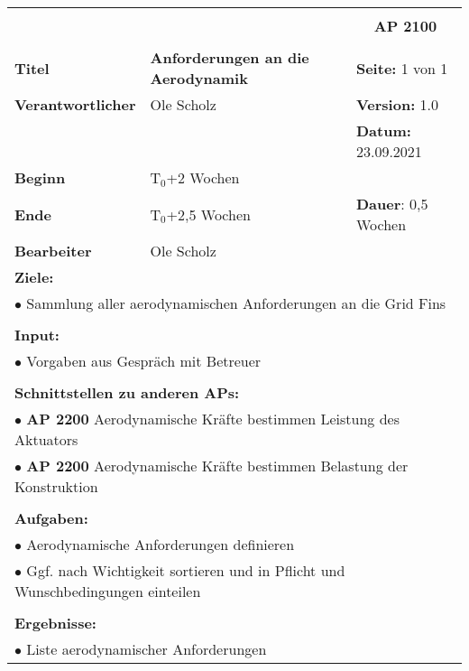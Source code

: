 \clearpage
\begin{table}[!h]
	\begin{center}
		\begin{tabular}{|p{35mm}||p{55mm}|p{50mm}||p{40mm}|}
			\hline
			\multicolumn{3}{|l||}{\textbf{}} & \multicolumn{1}{c|}{}\\
			\multicolumn{3}{|l||}{\textbf{}} & \multicolumn{1}{c|}{\textbf{AP 2100}}\\
			\multicolumn{3}{|l||}{\textbf{}} & \multicolumn{1}{c|}{}\\
			\hline\hline
			\textbf{Titel} & \multicolumn{2}{p{7cm}||}{\textbf{Anforderungen an die Aerodynamik}} 
			& \textbf{Seite:} 1 von 1\\
			\hline
			\textbf{Verantwortlicher} & \multicolumn{2}{l||}{Ole Scholz} & \textbf{Version:} 1.0\\
			\hline
			\multicolumn{3}{|l||}{} & \textbf{Datum:} 23.09.2021\\
			\hline\hline
			\textbf{Beginn} & \multicolumn{2}{l||}{T$_0$+2 Wochen} & \\
			\hline
			\textbf{Ende} & \multicolumn{2}{l||}{T$_0$+2,5 Wochen} & \textbf{Dauer}: 0,5 Wochen\\
			\hline\hline
			\textbf{Bearbeiter} & \multicolumn{3}{l|}{Ole Scholz}\\
			\hline\hline
			\multicolumn{4}{|p{150mm}|}{\textbf{Ziele:}}\\
			\multicolumn{4}{|p{150mm}|}{$\bullet$ Sammlung aller aerodynamischen Anforderungen an die Grid Fins}\\
			\multicolumn{4}{|p{150mm}|}{}\\
			\multicolumn{4}{|p{150mm}|}{\textbf{Input:}}\\
			\multicolumn{4}{|p{150mm}|}{$\bullet$ Vorgaben aus Gespräch mit Betreuer}\\
			\multicolumn{4}{|p{150mm}|}{}\\
			\multicolumn{4}{|p{150mm}|}{\textbf{Schnittstellen zu anderen APs:}}\\
			\multicolumn{4}{|p{150mm}|}{$\bullet$ \textbf{AP 2200} Aerodynamische Kräfte bestimmen Leistung des Aktuators}\\
			\multicolumn{4}{|p{150mm}|}{$\bullet$ \textbf{AP 2200} Aerodynamische Kräfte bestimmen Belastung der Konstruktion}\\
			\multicolumn{4}{|p{150mm}|}{}\\
			\multicolumn{4}{|p{150mm}|}{\textbf{Aufgaben:}}\\
			\multicolumn{4}{|p{150mm}|}{$\bullet$ Aerodynamische Anforderungen definieren}\\
			\multicolumn{4}{|p{150mm}|}{$\bullet$ Ggf. nach Wichtigkeit sortieren und in Pflicht und Wunschbedingungen einteilen}\\
			\multicolumn{4}{|p{150mm}|}{}\\
			\multicolumn{4}{|p{150mm}|}{\textbf{Ergebnisse:}}\\
			\multicolumn{4}{|p{150mm}|}{$\bullet$ Liste aerodynamischer Anforderungen}\\
			\hline
		\end{tabular}
	\end{center}
\end{table}

